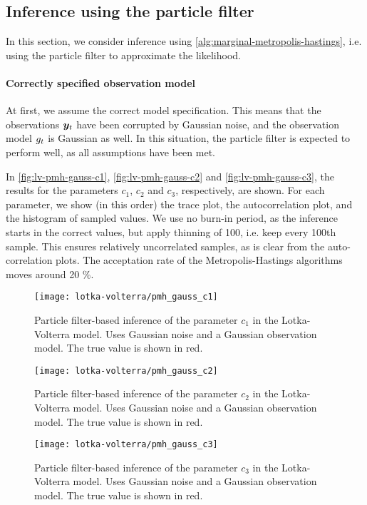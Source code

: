 \subsection{Inference using the particle filter}
In this section, we consider inference using \autoref{alg:marginal-metropolis-hastings}, i.e. using the particle filter to approximate the likelihood.

\paragraph{Correctly specified observation model}
At first, we assume the correct model specification. This means that the observations $\bm{y}_t$ have been corrupted by Gaussian noise, and the observation model $g_t$ is Gaussian as well. In this situation, the particle filter is expected to perform well, as all assumptions have been met.

In \autoref{fig:lv-pmh-gauss-c1}, \autoref{fig:lv-pmh-gauss-c2} and \autoref{fig:lv-pmh-gauss-c3}, the results for the parameters $c_1$, $c_2$ and $c_3$, respectively, are shown. For each parameter, we show (in this order) the trace plot, the autocorrelation plot, and the histogram of sampled values. We use no burn-in period, as the inference starts in the correct values, but apply thinning of 100, i.e. keep every 100th sample. This ensures relatively uncorrelated samples, as is clear from the auto-correlation plots. The acceptation rate of the Metropolis-Hastings algorithms moves around 20 \%.

\begin{figure}[htp]
    \centering
    \texttt{[image: lotka-volterra/pmh\_gauss\_c1]}
    \caption{Particle filter-based inference of the parameter $c_1$ in the Lotka-Volterra model. Uses Gaussian noise and a Gaussian observation model. The true value is shown in red.}
    \label{fig:lv-pmh-gauss-c1}
\end{figure}

\begin{figure}[htp]
    \centering
    \texttt{[image: lotka-volterra/pmh\_gauss\_c2]}
    \caption{Particle filter-based inference of the parameter $c_2$ in the Lotka-Volterra model. Uses Gaussian noise and a Gaussian observation model. The true value is shown in red.}
    \label{fig:lv-pmh-gauss-c2}
\end{figure}

\begin{figure}[htp]
    \centering
    \texttt{[image: lotka-volterra/pmh\_gauss\_c3]}
    \caption{Particle filter-based inference of the parameter $c_3$ in the Lotka-Volterra model. Uses Gaussian noise and a Gaussian observation model. The true value is shown in red.}
    \label{fig:lv-pmh-gauss-c3}
\end{figure}

